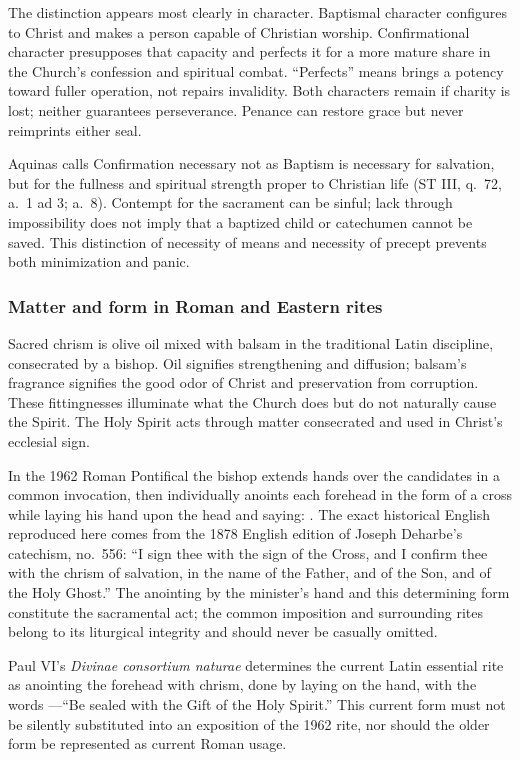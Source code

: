 The distinction appears most clearly in character. Baptismal character configures to Christ and makes a person capable of Christian worship. Confirmational character presupposes that capacity and perfects it for a more mature share in the Church's confession and spiritual combat. ``Perfects'' means brings a potency toward fuller operation, not repairs invalidity. Both characters remain if charity is lost; neither guarantees perseverance. Penance can restore grace but never reimprints either seal.

Aquinas calls Confirmation necessary not as Baptism is necessary for salvation, but for the fullness and spiritual strength proper to Christian life (ST III, q.~72, a.~1 ad 3; a.~8). Contempt for the sacrament can be sinful; lack through impossibility does not imply that a baptized child or catechumen cannot be saved. This distinction of necessity of means and necessity of precept prevents both minimization and panic.

\subsubsection{Matter and form in Roman and Eastern rites}

Sacred chrism is olive oil mixed with balsam in the traditional Latin discipline, consecrated by a bishop. Oil signifies strengthening and diffusion; balsam's fragrance signifies the good odor of Christ and preservation from corruption. These fittingnesses illuminate what the Church does but do not naturally cause the Spirit. The Holy Spirit acts through matter consecrated and used in Christ's ecclesial sign.

In the 1962 Roman Pontifical the bishop extends hands over the candidates in a common invocation, then individually anoints each forehead in the form of a cross while laying his hand upon the head and saying: . The exact historical English reproduced here comes from the 1878 English edition of Joseph Deharbe's catechism, no.~556: ``I sign thee with the sign of the Cross, and I confirm thee with the chrism of salvation, in the name of the Father, and of the Son, and of the Holy Ghost.'' The anointing by the minister's hand and this determining form constitute the sacramental act; the common imposition and surrounding rites belong to its liturgical integrity and should never be casually omitted.

Paul VI's \emph{Divinae consortium naturae} determines the current Latin essential rite as anointing the forehead with chrism, done by laying on the hand, with the words ---``Be sealed with the Gift of the Holy Spirit.'' This current form must not be silently substituted into an exposition of the 1962 rite, nor should the older form be represented as current Roman usage.

